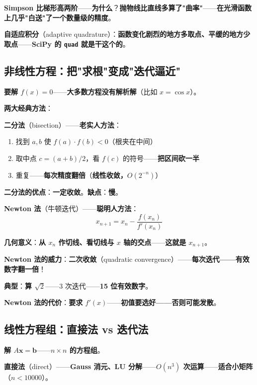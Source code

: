 \textbf{Simpson 比梯形高两阶}——\textbf{为什么}？\textbf{抛物线比直线多算了"曲率"}——\textbf{在光滑函数上几乎"白送"了一个数量级的精度}。

\textbf{自适应积分}（adaptive quadrature）：\textbf{函数变化剧烈的地方多取点、平缓的地方少取点}——\textbf{SciPy 的 \texttt{quad} 就是干这个的}。

\subsection{非线性方程：把"求根"变成"迭代逼近"}

\textbf{要解 $f(x) = 0$}——\textbf{大多数方程没有解析解}（比如 $x = \cos x$）。

\textbf{两大经典方法}：

\textbf{二分法}（bisection）——\textbf{老实人方法}：
\begin{enumerate}
\item 找到 $a, b$ 使 $f(a) \cdot f(b) < 0$（根夹在中间）
\item 取中点 $c = (a+b)/2$，看 $f(c)$ 的符号——\textbf{把区间砍一半}
\item 重复——\textbf{每次精度翻倍}（\textbf{线性收敛，$O(2^{-n})$}）
\end{enumerate}

\textbf{二分法的优点}：\textbf{一定收敛}。\textbf{缺点}：\textbf{慢}。

\textbf{Newton 法}（牛顿迭代）——\textbf{聪明人方法}：
\begin{equation}
x_{n+1} = x_n - \frac{f(x_n)}{f'(x_n)}
\end{equation}

\textbf{几何意义}：\textbf{从 $x_n$ 作切线、看切线与 $x$ 轴的交点}——\textbf{这就是 $x_{n+1}$}。

\textbf{Newton 法的威力}：\textbf{二次收敛}（quadratic convergence）——\textbf{每次迭代——有效数字翻一倍}！

\textbf{典型}：\textbf{算 $\sqrt{2}$}——3 次迭代——\textbf{15 位有效数字}。

\textbf{Newton 法的代价}：\textbf{要求 $f'(x)$}——\textbf{初值要选好——否则可能发散}。

\subsection{线性方程组：直接法 vs 迭代法}

\textbf{解 $A\bm{x} = \bm{b}$}——\textbf{$n \times n$ 的方程组}。

\textbf{直接法}（direct）——\textbf{Gauss 消元、LU 分解}——\textbf{$O(n^3)$ 次运算}——\textbf{适合小矩阵}（$n < 10000$）。

